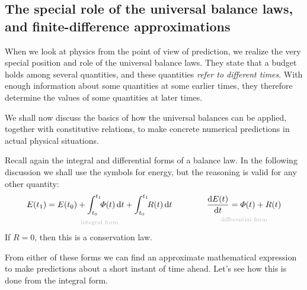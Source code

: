 \documentclass[a4paper,12pt,%
onecolumn,oneside,%
british%
]{memoir}
\newcommand*{\di}{\mathrm{d}}%
\renewcommand*{\|}[1][]{\nonscript\:#1\vert\nonscript\:\mathopen{}}
\newcommand*{\yti}{t_{0}}
\newcommand*{\ytf}{t_{1}}
\newcommand*{\yE}{E}
\newcommand*{\yH}{\varPhi}%
\newcommand*{\yR}{R}%
\begin{document}
\subsection{The special role of the universal balance laws, and finite-difference approximations}
\label{sec:forecast_balances}

When we look at physics from the point of view of prediction, we realize the very special position and role of the universal balance laws. They state that a budget holds among several quantities, and these quantities \emph{refer to different times}. With enough information about some quantities at some earlier times, they therefore determine the values of some quantities at later times.

We shall now discuss the basics of how the universal balances can be applied, together with constitutive relations, to make concrete numerical predictions in actual physical situations.

\smallskip


Recall again the integral and differential forms of a balance law. In the following discussion we shall use the symbols for energy, but the reasoning is valid for any other quantity:
\begin{equation*}
      \underbracket[0pt]{\yE(\ytf) = \yE(\yti) + \int_{\yti}^{\ytf}\!\!\yH(t)\,\di t + \int_{\yti}^{\ytf}\!\!\yR(t)\,\di t}_{\mathclap{\text{\color{grey}integral form}}}
      \qquad%
      \qquad
      \underbracket[0pt]{\frac{\di\yE(t)}{\di t} = \yH(t) + \yR(t)}_{\mathclap{\text{\color{grey}differential form}}}
\end{equation*}
If $\yR=0$, then this is a conservation law.

From either of these forms we can find an approximate mathematical expression to make predictions about a short instant of time ahead. Let's see how this is done from the integral form.
\end{document}
